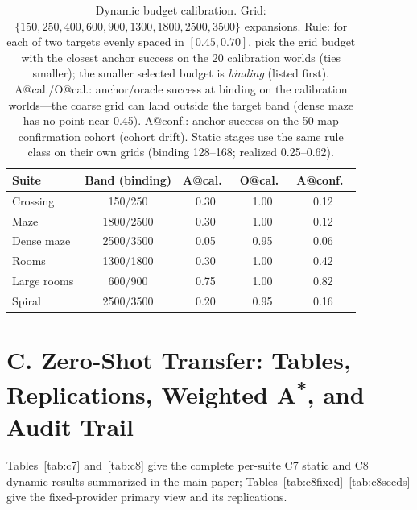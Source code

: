\documentclass[letterpaper]{article} %
\newcommand{\stage}[1]{\textsc{#1}}
\begin{document}
\begin{table}[t]
\centering
\small
\setlength{\tabcolsep}{2.6pt}
\begin{tabular}{@{}lcccc@{}}
\toprule
Suite & Band (binding) & A@cal.\ & O@cal.\ & A@conf.\ \\
\midrule
Crossing & 150/250 & 0.30 & 1.00 & 0.12 \\
Maze & 1800/2500 & 0.30 & 1.00 & 0.12 \\
Dense maze & 2500/3500 & 0.05 & 0.95 & 0.06 \\
Rooms & 1300/1800 & 0.30 & 1.00 & 0.42 \\
Large rooms & 600/900 & 0.75 & 1.00 & 0.82 \\
Spiral & 2500/3500 & 0.20 & 0.95 & 0.16 \\
\bottomrule
\end{tabular}
\caption{Dynamic budget calibration. Grid: $\{150, 250, 400, 600, 900, 1300, 1800, 2500, 3500\}$ expansions. Rule: for each of two targets evenly spaced in $[0.45, 0.70]$, pick the grid budget with the closest anchor success on the 20 calibration worlds (ties smaller); the smaller selected budget is \emph{binding} (listed first). A@cal./O@cal.: anchor/oracle success at binding on the calibration worlds---the coarse grid can land outside the target band (dense maze has no point near 0.45). A@conf.: anchor success on the 50-map confirmation cohort (cohort drift). Static stages use the same rule class on their own grids (binding 128--168; realized 0.25--0.62).}
\label{tab:calib}
\end{table}

\section{C. Zero-Shot Transfer: Tables, Replications, Weighted A\textsuperscript{*}, and Audit Trail}

Tables~\ref{tab:c7} and~\ref{tab:c8} give the complete per-suite \stage{C7} static and \stage{C8} dynamic results summarized in the main paper; Tables~\ref{tab:c8fixed}--\ref{tab:c8seeds} give the fixed-provider primary view and its replications.
\end{document}
